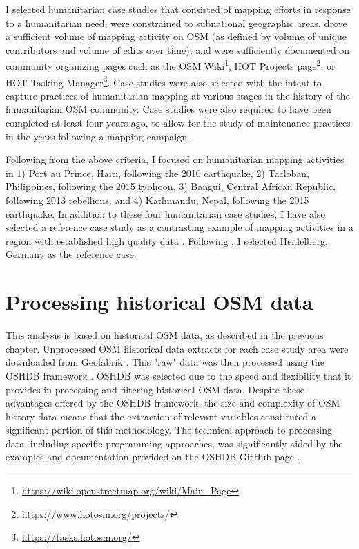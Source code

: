 I selected humanitarian case studies that consisted of mapping efforts in response to a humanitarian need, were constrained to subnational geographic areas, drove a sufficient volume of mapping activity on OSM (as defined by volume of unique contributors and volume of edits over time), and were sufficiently documented on community organizing pages such as the OSM Wiki\footnote{\url{https://wiki.openstreetmap.org/wiki/Main_Page}}, HOT Projects page\footnote{\url{https://www.hotosm.org/projects/}}, or HOT Tasking Manager\footnote{\url{https://tasks.hotosm.org/}}. Case studies were also selected with the intent to capture practices of humanitarian mapping at various stages in the history of the humanitarian OSM community. Case studies were also required to have been completed at least four years ago, to allow for the study of maintenance practices in the years following a mapping campaign.  

Following from the above criteria, I focused on humanitarian mapping activities in 1) Port au Prince, Haiti, following the 2010 earthquake, 2) Tacloban, Philippines, following the 2015 typhoon, 3) Bangui, Central African Republic, following 2013 rebellions, and 4) Kathmandu, Nepal, following the 2015 earthquake. In addition to these four humanitarian case studies, I have also selected a reference case study as a contrasting example of mapping activities in a region with established high quality data \parencite{arsanjani_assessing_2013}. Following \textcite{anderson_crowd_2018}, I selected Heidelberg, Germany as the reference case.

\section{Processing historical OSM data}
\label{sec:history}

This analysis is based on historical OSM data, as described in the previous chapter. Unprocessed OSM historical data extracts for each case study area were downloaded from Geofabrik \parencite{geofabrik_openstreetmap_2020}. This "raw" data was then processed using the OSHDB framework \parencite{raifer_oshdb_2019}. OSHDB was selected due to the speed and flexibility that it provides in processing and filtering historical OSM data. Despite these advantages offered by the OSHDB framework, the size and complexity of OSM history data means that the extraction of relevant variables constituted a significant portion of this methodology. The technical approach to processing data, including specific programming approaches, was significantly aided by the examples and documentation provided on the OSHDB GitHub page \parencite{heidelberg_institute_for_geoinformation_technology_oshdb_2020}.

